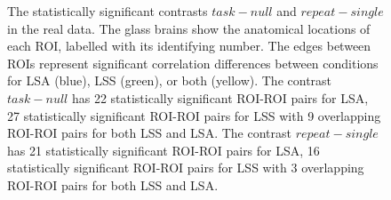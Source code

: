 \documentclass[10pt,letterpaper]{article}
\begin{document}
\begin{figure}[H]
  \centering


  \caption{
   The statistically significant contrasts $task - null$ and $repeat - single$
   in the real data.
   The glass brains show the anatomical locations of each ROI,
   labelled with its identifying number.
   The edges between ROIs represent significant correlation differences
   between conditions for LSA (blue), LSS (green), or both (yellow).
   The contrast $task - null$ has 22 statistically significant ROI-ROI
   pairs for LSA, 27 statistically significant ROI-ROI pairs
   for LSS with 9 overlapping ROI-ROI pairs for both LSS and LSA.
   The contrast $repeat - single$ has 21 statistically significant ROI-ROI
   pairs for LSA, 16 statistically significant ROI-ROI pairs
   for LSS with 3 overlapping ROI-ROI pairs for both LSS and LSA. 
  }
  \label{fig:significant-contrasts}
\end{figure}

\end{document}
